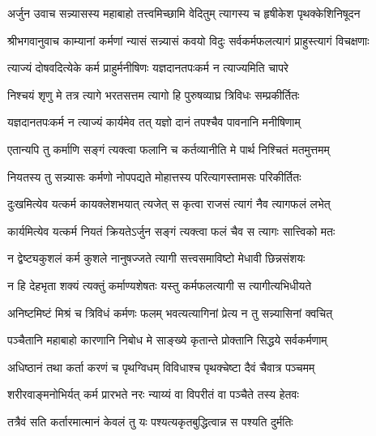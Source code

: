 {अर्जुन उवाच}
\twolineshloka
{सन्न्यासस्य महाबाहो तत्त्वमिच्छामि वेदितुम्}
{त्यागस्य च हृषीकेश पृथक्केशिनिषूदन}%

\begin{minipage}{\linewidth}
\centering
{श्रीभगवानुवाच}
\twolineshloka
{काम्यानां कर्मणां न्यासं सन्न्यासं कवयो विदुः}
{सर्वकर्मफलत्यागं प्राहुस्त्यागं विचक्षणाः}%
\end{minipage}

\twolineshloka
{त्याज्यं दोषवदित्येके कर्म प्राहुर्मनीषिणः}
{यज्ञदानतपःकर्म न त्याज्यमिति चापरे}%

\twolineshloka
{निश्चयं शृणु मे तत्र त्यागे भरतसत्तम}
{त्यागो हि पुरुषव्याघ्र त्रिविधः सम्प्रकीर्तितः}%

\twolineshloka
{यज्ञदानतपःकर्म न त्याज्यं कार्यमेव तत्}
{यज्ञो दानं तपश्चैव पावनानि मनीषिणाम्}%

\twolineshloka
{एतान्यपि तु कर्माणि सङ्गं त्यक्त्वा फलानि च}
{कर्तव्यानीति मे पार्थ निश्चितं मतमुत्तमम्}%

\twolineshloka
{नियतस्य तु सन्न्यासः कर्मणो नोपपद्यते}
{मोहात्तस्य परित्यागस्तामसः परिकीर्तितः}%

\twolineshloka
{दुःखमित्येव यत्कर्म कायक्लेशभयात् त्यजेत्}
{स कृत्वा राजसं त्यागं नैव त्यागफलं लभेत्}%

\twolineshloka
{कार्यमित्येव यत्कर्म नियतं क्रियतेऽर्जुन}
{सङ्गं त्यक्त्वा फलं चैव स त्यागः सात्त्विको मतः}%

\twolineshloka
{न द्वेष्ट्यकुशलं कर्म कुशले नानुषज्जते}
{त्यागी सत्त्वसमाविष्टो मेधावी छिन्नसंशयः}%

\twolineshloka
{न हि देहभृता शक्यं त्यक्तुं कर्माण्यशेषतः}
{यस्तु कर्मफलत्यागी स त्यागीत्यभिधीयते}%

\twolineshloka
{अनिष्टमिष्टं मिश्रं च त्रिविधं कर्मणः फलम्}
{भवत्यत्यागिनां प्रेत्य न तु सन्न्यासिनां क्वचित्}%

\twolineshloka
{पञ्चैतानि महाबाहो कारणानि निबोध मे}
{साङ्ख्ये कृतान्ते प्रोक्तानि सिद्धये सर्वकर्मणाम्}%

\twolineshloka
{अधिष्ठानं तथा कर्ता करणं च पृथग्विधम्}
{विविधाश्च पृथक्चेष्टा दैवं चैवात्र पञ्चमम्}%

\twolineshloka
{शरीरवाङ्मनोभिर्यत् कर्म प्रारभते नरः}
{न्याय्यं वा विपरीतं वा पञ्चैते तस्य हेतवः}%

\twolineshloka
{तत्रैवं सति कर्तारमात्मानं केवलं तु यः}
{पश्यत्यकृतबुद्धित्वान्न स पश्यति दुर्मतिः}%

